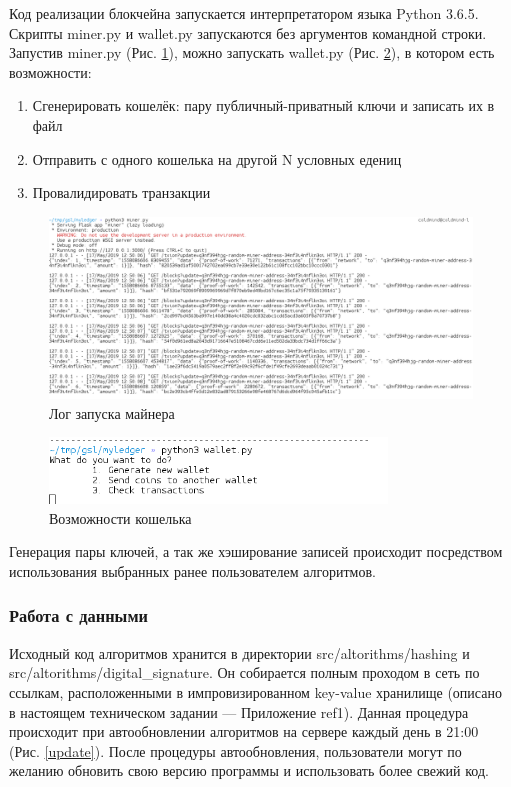 Код реализации блокчейна запускается интерпретатором языка Python 3.6.5.
Скрипты {\small miner.py} и {\small wallet.py} запускаются без аргументов
командной строки. Запустив {\small miner.py} (Рис. \ref{miner_run}), можно запускать {\small
wallet.py} (Рис. \ref{wallet_run}), в котором есть возможности:
\begin{enumerate}
    \item Сгенерировать кошелёк: пару публичный-приватный ключи и записать их в файл
    \item Отправить с одного кошелька на другой N условных едениц
    \item Провалидировать транзакции
\end{enumerate}

\begin{figure}[h]
    \centering
    \includegraphics[width=\textwidth]{images/miner_run}
    \caption{Лог запуска майнера}\label{miner_run}
\end{figure}

\begin{figure}[h]
    \centering
    \includegraphics[width=0.8\textwidth]{images/wallet_run}
    \caption{Возможности кошелька}\label{wallet_run}
\end{figure}

Генерация пары ключей, а так же хэширование записей происходит посредством
использования выбранных ранее пользователем алгоритмов.

\newpage
\subsubsection{Работа с данными}\label{autoonova}
Исходный код алгоритмов хранится в директории {\small src/altorithms/hashing} и
{\small src/altorithms/digital\_signature}. Он собирается полным проходом в
сеть по ссылкам, расположенными в импровизированном key-value хранилище
(описано в настоящем техническом задании --- Приложение ref1). Данная процедура
происходит при автообновлении алгоритмов на сервере каждый день в 21:00
(Рис. \ref{update}). После процедуры автообновления, пользователи могут по
желанию обновить свою версию программы и использовать более свежий код.

